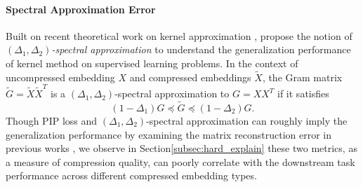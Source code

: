 \paragraph{Spectral Approximation Error}
Built on recent theoretical work on kernel approximation \citep{avron17}, \citet{lprff18} propose the notion of \textit{$(\Delta_1,\Delta_2)$-spectral approximation} to understand the generalization performance of kernel method on supervised learning problems. In the context of uncompressed embedding $X$ and compressed embeddings $\tilde{X}$, the Gram matrix $\tilde{G} = \tilde{X}\tilde{X}^T$ is a $(\Delta_1,\Delta_2)$-spectral approximation to $G = XX^T$ if it satisfies 
\[(1-\Delta_1) G \preceq \tilde{G} \preceq (1-\Delta_2) G.\]
Though PIP loss and $(\Delta_1,\Delta_2)$-spectral approximation can roughly imply the generalization performance by examining the matrix reconstruction error in previous works \citep{avron17,yin18,lprff18}, we observe in Section\ref{subsec:hard_explain} these two metrics, as a measure of compression quality, can poorly correlate with the downstream task performance across different compressed embedding types.
	

